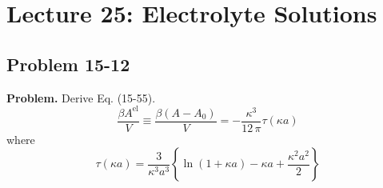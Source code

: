 \documentclass[twocolumn, 10pt]{article}
\numberwithin{equation}{section}
\newenvironment{problem}
{\par\medskip \color{problue}
  \textbf{Problem. }\ignorespaces}
{\medskip}
\begin{document}
\section{Lecture 25: Electrolyte Solutions}

\subsection{Problem 15-12}

\begin{problem}
  Derive Eq. (15-55).
  \begin{equation}
    \frac{ \beta A^\mathrm{el} } { V }
    \equiv
    \frac{ \beta (A - A_0) } { V }
    =
    -\frac{ \kappa^3 } { 12 \, \pi }
    \tau(\kappa a)
    \tag{15-55}
  \end{equation}
  where
  \begin{equation}
    \tau(\kappa a)
    =
    \frac{3}{\kappa^3 a^3}
    \left\{
      \ln(1 + \kappa a)
      -\kappa a
      + \frac{ \kappa^2 a^2 } { 2}
    \right\}
    \tag{15-56}
  \end{equation}
\end{problem}
\end{document}
